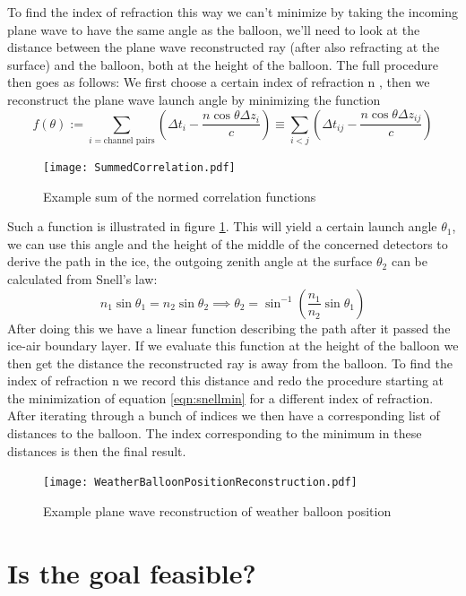 To find the index of refraction this way we can't minimize by taking the incoming plane wave
to have the same angle as the balloon, we'll need to look at the distance between the 
plane wave reconstructed ray (after also refracting at the surface) and the balloon,
both at the height of the balloon.
The full procedure then goes as follows: We first choose a certain index of refraction n 
, then we reconstruct the plane wave launch angle by minimizing the function
\begin{equation}
	f(\theta) := \sum_{i=\text{channel pairs}}\left( \Delta t_i - \frac{n\cos\theta \Delta z_i}{c}\right) \equiv \sum_{i<j}\left( \Delta t_{ij} - \frac{n\cos\theta \Delta z_{ij}}{c}\right)\label{eqn:snellmin}
\end{equation}
\begin{figure}
	\centering
	\texttt{[image: SummedCorrelation.pdf]}
	\caption{Example sum of the normed correlation functions}
	\label{fig:SummedCorrelation}
\end{figure}
Such a function is illustrated in figure \ref{fig:SummedCorrelation}.
This will yield a certain launch angle $\theta_1$, we can use this angle and the height of the middle of the
concerned detectors to derive the path in the ice,
the outgoing zenith angle at the surface $\theta_2$ can be calculated from Snell's law:
\begin{equation}
	n_1 \sin{\theta_1} = n_2 \sin{\theta_2} \implies  \theta_2 = \sin^{-1}\left(\frac{n_1}{n_2}\sin{\theta_1}\right)
\end{equation}
After doing this we have a linear function describing the path after it passed the ice-air boundary layer.
If we evaluate this function at the height of the balloon we then get the distance
the reconstructed ray is away from the balloon.
To find the index of refraction n we record this distance and redo the procedure starting at the minimization of equation \ref{eqn:snellmin} for a different index of refraction. After iterating through a bunch of indices we then have a corresponding list of distances
to the balloon. The index corresponding to the minimum in these distances is then the final result.
\begin{figure}
	\centering
	\texttt{[image: WeatherBalloonPositionReconstruction.pdf]}
	\caption{Example plane wave reconstruction of weather balloon position}
	\label{fig:WeatherBalloonPositionReconstruction}
\end{figure}
\section{Is the goal feasible?}
